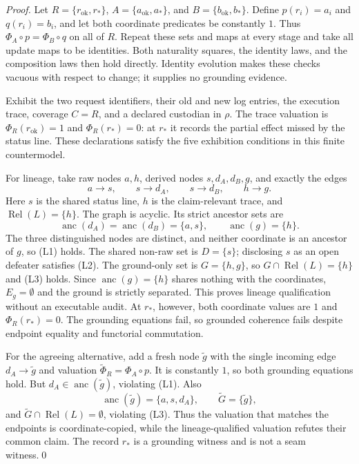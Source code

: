 \documentclass[smallextended,envcountsect,envcountsame,natbib]{svjour3}
\begin{document}
\begin{proof}
Let $R=\{r_{\mathrm{ok}},r_*\}$, $A=\{a_{\mathrm{ok}},a_*\}$, and $B=\{b_{\mathrm{ok}},b_*\}$. Define $p(r_i)=a_i$ and $q(r_i)=b_i$, and let both coordinate predicates be constantly $1$. Thus $\Phi_A\circ p=\Phi_B\circ q$ on all of $R$. Repeat these sets and maps at every stage and take all update maps to be identities. Both naturality squares, the identity laws, and the composition laws then hold directly. Identity evolution makes these checks vacuous with respect to change; it supplies no grounding evidence.

Exhibit the two request identifiers, their old and new log entries, the execution trace, coverage $C=R$, and a declared custodian in $\rho$. The trace valuation is $\Phi_R(r_{\mathrm{ok}})=1$ and $\Phi_R(r_*)=0$: at $r_*$ it records the partial effect missed by the status line. These declarations satisfy the five exhibition conditions in this finite countermodel.

For lineage, take raw nodes $a,h$, derived nodes $s,d_A,d_B,g$, and exactly the edges
\[
a\to s,\qquad s\to d_A,\qquad s\to d_B,\qquad h\to g.
\]
Here $s$ is the shared status line, $h$ is the claim-relevant trace, and $\operatorname{Rel}(L)=\{h\}$. The graph is acyclic. Its strict ancestor sets are
\[
\operatorname{anc}(d_A)=\operatorname{anc}(d_B)=\{a,s\},
\qquad \operatorname{anc}(g)=\{h\}.
\]
The three distinguished nodes are distinct, and neither coordinate is an ancestor of $g$, so (L1) holds. The shared non-raw set is $D=\{s\}$; disclosing $s$ as an open defeater satisfies (L2). The ground-only set is $G=\{h,g\}$, so $G\cap\operatorname{Rel}(L)=\{h\}$ and (L3) holds. Since $\operatorname{anc}(g)=\{h\}$ shares nothing with the coordinates, $E_g=\emptyset$ and the ground is strictly separated. This proves lineage qualification without an executable audit. At $r_*$, however, both coordinate values are $1$ and $\Phi_R(r_*)=0$. The grounding equations fail, so grounded coherence fails despite endpoint equality and functorial commutation.

For the agreeing alternative, add a fresh node $\widetilde g$ with the single incoming edge $d_A\to\widetilde g$ and valuation $\widetilde\Phi_R=\Phi_A\circ p$. It is constantly $1$, so both grounding equations hold. But $d_A\in\operatorname{anc}(\widetilde g)$, violating (L1). Also
\[
\operatorname{anc}(\widetilde g)=\{a,s,d_A\},
\qquad \widetilde G=\{\widetilde g\},
\]
and $\widetilde G\cap\operatorname{Rel}(L)=\emptyset$, violating (L3). Thus the valuation that matches the endpoints is coordinate-copied, while the lineage-qualified valuation refutes their common claim. The record $r_*$ is a grounding witness and is not a seam witness.\qed
\end{proof}
\end{document}
